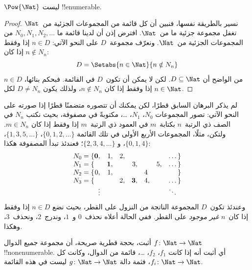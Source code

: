 \documentclass[../../../include/open-logic-section]{subfiles}
\begin{document}
\begin{thm}
$\Pow{\Nat}$ ليست !!{enumerable}.
\end{thm}

\begin{proof}
نسير بالطريقة نفسها، فنبين أن كل قائمة من المجموعات الجزئية من~$\Nat$
تغفل مجموعة جزئية ما من~$\Nat$. افترض إذن أن لدينا قائمة ما
$N_0, N_1, N_2, \ldots$ من المجموعات الجزئية من~$\Nat$. ونعرّف
مجموعة~$D$ على النحو الآتي: $n \in D$ إذا وفقط إذا كان $n \notin
N_{n}$:
\[
D = \Setabs{n \in \Nat}{n \notin N_n}
\]
من الواضح أن $D\subseteq \Nat$. لكن لا يمكن أن تكون~$D$ في القائمة.
فبحكم بنائها، $n \in D$ إذا وفقط إذا كان $n\notin N_n$، ولذلك يكون
$D \neq N_n$ لكل $n \in \Nat$.
\end{proof}

\begin{explain}
لم يذكر البرهان السابق قطرًا، لكن يمكنك أن تتصوره متضمنًا قطرًا إذا
صورته على النحو الآتي: تصور المجموعات $N_0$، $N_1$، \dots، مكتوبةً
في مصفوفة، بحيث نكتب $N_n$ في الصف ذي الرتبة~$n$ بكتابة~$m$ في
العمود ذي الرتبة~$m$ إذا وفقط إذا كان $m \in N_n$. ولتكن، مثلًا،
المجموعات الأربع الأولى في تلك القائمة
$\{0,1,2,\dots\}$، $\{1, 3, 5, \dots\}$، $\{0,1,4\}$، و
$\{2,3,4,\dots\}$؛ فعندئذ تبدأ المصفوفة هكذا:
\[
\begin{array}{r@{}rrrrrrr}
  N_0 = \{ & \mathbf{0}, & 1, & 2, & & & & \dots\}\\
  N_1 = \{ &  & \mathbf{1}, &  & 3, &  & 5, & \dots\}\\
  N_2 = \{ & 0, & 1, &  &  & 4\phantom{,} &  & \}\\
  N_3 = \{ &  &  & 2, & \mathbf{3}, & 4, & & \dots\}\\
  &\vdots & & & & & & \ddots\phantom{\}}
  \end{array}
\]
وعندئذ تكون~$D$ المجموعة الناتجة من النزول على القطر، بحيث نضع
$n \in D$ إذا وفقط إذا كان~$n$ \emph{غير موجود} على القطر. ففي
الحالة أعلاه نحذف~$0$ و~$1$، وندرج~$2$، ونحذف~$3$، وهكذا.
\end{explain}

\begin{prob}
أثبت، بحجة قطرية صريحة، أن مجموعة جميع الدوال $f \colon \Nat \to
\Nat$ !!{nonenumerable}. أي أثبت أنه إذا كانت $f_1$، $f_2$، \dots،
قائمة من الدوال، وكانت كل $f_i\colon \Nat \to \Nat$، فثمة دالة
$g \colon \Nat \to \Nat$ ليست في هذه القائمة.
\end{prob}
\end{document}
